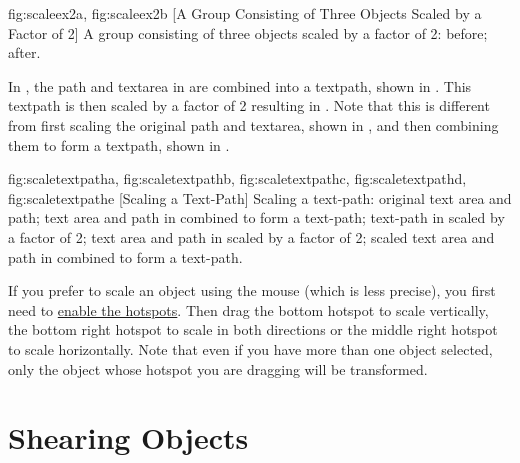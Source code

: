 {
 {fig:scaleex2a}{}{},
 {fig:scaleex2b}{}{}
}
[A Group Consisting of Three Objects Scaled by a Factor of 2]
{A group consisting of three objects scaled by a factor of 2:
 before;
 after.}

In , the \gls*{path} and
\gls*{textarea} in  are combined
into a \gls*{textpath}, shown in
. This \gls*{textpath} is then
scaled by a factor of 2 resulting in
. Note that this is different
from first scaling the original \gls*{path} and \gls*{textarea},
shown in , and then combining
them to form a \gls*{textpath}, shown in
.

{
 {fig:scaletextpatha}{}{},
 {fig:scaletextpathb}{}{},
 {fig:scaletextpathc}{}{},
 {fig:scaletextpathd}{}{},
 {fig:scaletextpathe}{}{}
}
[Scaling a Text-Path]
{Scaling a text-path:
 original text area and path;
 text area and path in
 combined to form a text-path;
 text-path 
in  scaled by a factor of 2;
 text area and path 
in  scaled by a factor of 2;
 scaled text area and path 
in  combined to form a text-path.}

If you prefer to scale an \gls{object} using the mouse (which is
less precise), you first need to \hyperref[mi:hotspots]{enable the
hotspots}. Then drag the bottom  hotspot to scale
vertically, the bottom right hotspot to scale in both directions or
the middle right hotspot to scale horizontally. Note that even if
you have more than one object selected, only the object whose
hotspot you are dragging will be transformed.




\section{Shearing Objects}\label{sec:shearobjects}


